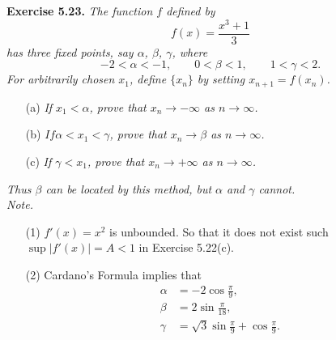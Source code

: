\documentclass{article}
\begin{document}



\textbf{Exercise 5.23.}
\emph{The function $f$ defined by
\[
  f(x) = \frac{x^3 + 1}{3}
\]
has three fixed points, say $\alpha$, $\beta$, $\gamma$, where
\[
  -2 < \alpha < -1, \qquad
  0 < \beta < 1, \qquad
  1 < \gamma < 2.
\]
For arbitrarily chosen $x_1$, define $\{x_n\}$ by setting $x_{n+1} = f(x_n)$.}
\begin{enumerate}
  \item[(a)]
  \emph{If $x_1 < \alpha$, prove that $x_n \to -\infty$ as $n \to \infty$.}

  \item[(b)]
  \emph{$If \alpha < x_1 < \gamma$, prove that $x_n \to \beta$ as $n \to \infty$.}

  \item[(c)]
  \emph{If $\gamma < x_1$, prove that $x_n \to +\infty$ as $n \to \infty$.}
  \end{enumerate}
\emph{Thus $\beta$ can be located by this method,
but $\alpha$ and $\gamma$ cannot.} \\

\emph{Note.}
\begin{enumerate}
\item[(1)]
$f'(x) = x^2$ is unbounded.
So that it does not exist such $\sup|f'(x)| = A < 1$ in Exercise 5.22(c).

\item[(2)]
Cardano's Formula implies that
\begin{align*}
  \alpha &= -2 \cos\frac{\pi}{9}, \\
  \beta &= 2 \sin\frac{\pi}{18}, \\
  \gamma &= \sqrt{3} \sin\frac{\pi}{9} + \cos\frac{\pi}{9}.
\end{align*}
\end{enumerate}
\end{document}
